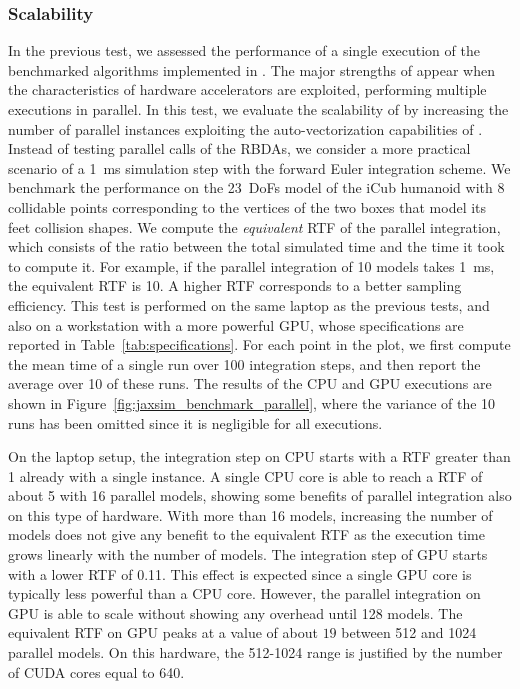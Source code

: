 \newpage
\subsubsection{Scalability}

In the previous test, we assessed the performance of a single execution of the benchmarked algorithms implemented in \jaxsim.
The major strengths of \jaxsim appear when the characteristics of hardware accelerators are exploited, performing multiple executions in parallel.
In this test, we evaluate the scalability of \jaxsim by increasing the number of parallel instances exploiting the auto-vectorization capabilities of \jax.
Instead of testing parallel calls of the \acp{RBDA}, we consider a more practical scenario of a 1~ms simulation step with the forward Euler integration scheme.
We benchmark the performance on the 23~\acp{DoF} model of the iCub humanoid with 8 collidable points corresponding to the vertices of the two boxes that model its feet collision shapes.
We compute the \emph{equivalent} \ac{RTF} of the parallel integration, which consists of the ratio between the total simulated time and the time it took to compute it.
For example, if the parallel integration of 10 models takes 1~ms, the equivalent \ac{RTF} is 10.
A higher \ac{RTF} corresponds to a better sampling efficiency.
This test is performed on the same laptop as the previous tests, and also on a workstation with a more powerful \ac{GPU}, whose specifications are reported in Table~\ref{tab:specifications}.
For each point in the plot, we first compute the mean time of a single run over 100 integration steps, and then report the average over 10 of these runs.
The results of the \ac{CPU} and \ac{GPU} executions are shown in Figure~\ref{fig:jaxsim_benchmark_parallel}, where the variance of the 10 runs has been omitted since it is negligible for all executions.

On the laptop setup, the integration step on \ac{CPU} starts with a \ac{RTF} greater than 1 already with a single instance.
A single \ac{CPU} core is able to reach a \ac{RTF} of about 5 with 16 parallel models, showing some benefits of parallel integration also on this type of hardware.
With more than 16 models, increasing the number of models does not give any benefit to the equivalent \ac{RTF} as the execution time grows linearly with the number of models.
The integration step of \ac{GPU} starts with a lower \ac{RTF} of 0.11.
This effect is expected since a single \ac{GPU} core is typically less powerful than a \ac{CPU} core.
However, the parallel integration on \ac{GPU} is able to scale without showing any overhead until 128 models.
The equivalent \ac{RTF} on \ac{GPU} peaks at a value of about $19$ between 512 and 1024 parallel models.
On this hardware, the 512-1024 range is justified by the number of CUDA cores equal to 640.

